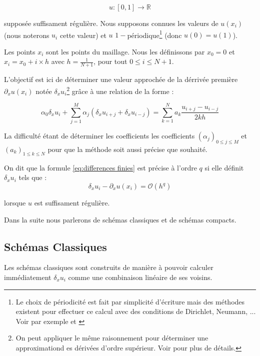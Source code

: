 $$u : [0, 1] \rightarrow \mathbb{R}$$

 supposée suffisament régulière. Nous supposons connues les valeurs de $u(x_i)$
(nous noterons $u_i$ cette valeur) et $u$ $1-$périodique\footnote{Le choix de périodicité est fait par simplicité d'écriture mais des méthodes existent pour effectuer ce calcul avec des conditions de Dirichlet, Neumann, ... Voir par exemple \cite{Abbas2011} et \cite{Brachet2015}} (donc $u(0) = u(1)$).

Les points $x_i$ sont les points du maillage. Nous les définissons par
$x_0 = 0$ et $x_i = x_0 + i \times h$ avec $h = \frac{1}{N+1}$, pour
tout $ 0 \leq i \leq N+1 $.

L'objectif est ici de déterminer une valeur approchée de la dérrivée
première $\partial_xu(x_i)$ notée $\delta_x u_i$\footnote{On peut
  appliquer le m\^eme raisonnement pour déterminer une approximationd es
dérivées d'ordre supérieur. Voir \cite{Lele1991} pour plus de détails.} gr\^ace à une relation de la forme :

\begin{equation}
\label{eq:differences finies}
\alpha_0 \delta_x u_i + \sum_{j=1}^M \alpha_j \left( \delta_x u_{i+j} + \delta_x
u_{i-j} \right) = \sum_{k=1}^N a_k \dfrac{u_{i+j} - u_{i-j}}{2kh}
\end{equation}

La difficulté étant de déterminer les coefficients les coefficients
$(\alpha_j)_{0 \leq j \leq M}$ et $(a_k)_{1 \leq k \leq N}$ pour que la
méthode soit aussi précise que souhaité.

\begin{definition}
On dit que la formule \eqref{eq:differences finies} est précise à
l'ordre $q$ si elle définit $\delta_x u_i$ tels que :
\begin{equation}
 \delta_x u_i - \partial_x u(x_i) = \mathcal{O} \left( h^q \right)
\end{equation}

lorsque $u$ est suffisament régulière.
\end{definition}

Dans la suite nous parlerons de schémas classiques et de schémas
compacts.

\subsection{Schémas Classiques }

Les schémas classiques sont construits de manière à pouvoir calculer
immédiatement $\delta_x u_i$ comme une combinaison linéaire de ses
voisins.

